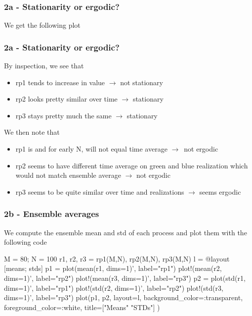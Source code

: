 \documentclass[compress]{beamer}
\begin{document}
\begin{frame}
    \frametitle{2a - Stationarity or ergodic?}
    We get the following plot
    \begin{figure}
        
    \end{figure}
\end{frame}

\begin{frame}
    \frametitle{2a - Stationarity or ergodic?}
    By inspection, we see that
    \begin{itemize}
        \item rp1 tends to increase in value $\rightarrow$ not stationary
        \item rp2 looks pretty similar over time $\rightarrow$ stationary
        \item rp3 stays pretty much the same $\rightarrow$ stationary
    \end{itemize}
    We then note that
    \begin{itemize}
        \item rp1 is and for early N, will not equal time average
            $\rightarrow$ not ergodic
        \item rp2 seems to have different time average on green and blue
            realization which would not match ensemble average $\rightarrow$
            not ergodic
        \item rp3 seems to be quite similar over time and realizations
            $\rightarrow$ seems ergodic
    \end{itemize}
\end{frame}

\begin{frame}[fragile]
    \frametitle{2b - Ensemble averages}
    We compute the ensemble mean and std of each process
    and plot them with the following code
    \begin{jllisting}[gobble=8]
        M = 80; N = 100
        r1, r2, r3 = rp1(M,N), rp2(M,N), rp3(M,N)
        l = @layout [means; stds]
        p1 = plot(mean(r1, dims=1)', label="rp1")
        plot!(mean(r2, dims=1)', label="rp2")
        plot!(mean(r3, dims=1)', label="rp3")
        p2 = plot(std(r1, dims=1)', label="rp1")
        plot!(std(r2, dims=1)', label="rp2")
        plot!(std(r3, dims=1)', label="rp3")
        plot(p1, p2, layout=l,
            background_color=:transparent,
            foreground_color=:white,
            title=["Means" "STDs"]
        )
    \end{jllisting}
\end{frame}
\end{document}
